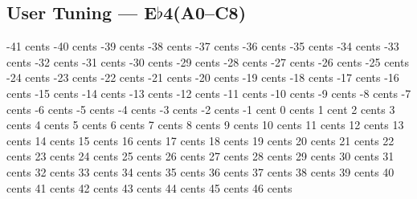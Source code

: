 \subsection[User Tuning]{User Tuning --- \UiKey{\I}\UiKey{\SET}E$\flat$4(A0--C8)}
-41 cents
-40 cents
-39 cents
-38 cents
-37 cents
-36 cents
-35 cents
-34 cents
-33 cents
-32 cents
-31 cents
-30 cents
-29 cents
-28 cents
-27 cents
-26 cents
-25 cents
-24 cents
-23 cents
-22 cents
-21 cents
-20 cents
-19 cents
-18 cents
-17 cents
-16 cents
-15 cents
-14 cents
-13 cents
-12 cents
-11 cents
-10 cents
-9  cents
-8  cents
-7  cents
-6  cents
-5  cents
-4  cents
-3  cents
-2  cents
-1  cent
0   cents
1   cent
2   cents
3   cents
4   cents
5   cents
6   cents
7   cents
8   cents
9   cents
10  cents
11  cents
12  cents
13  cents
14  cents
15  cents
16  cents
17  cents
18  cents
19  cents
20  cents
21  cents
22  cents
23  cents
24  cents
25  cents
26  cents
27  cents
28  cents
29  cents
30  cents
31  cents
32  cents
33  cents
34  cents
35  cents
36  cents
37  cents
38  cents
39  cents
40  cents
41  cents
42  cents
43  cents
44  cents
45  cents
46  cents
